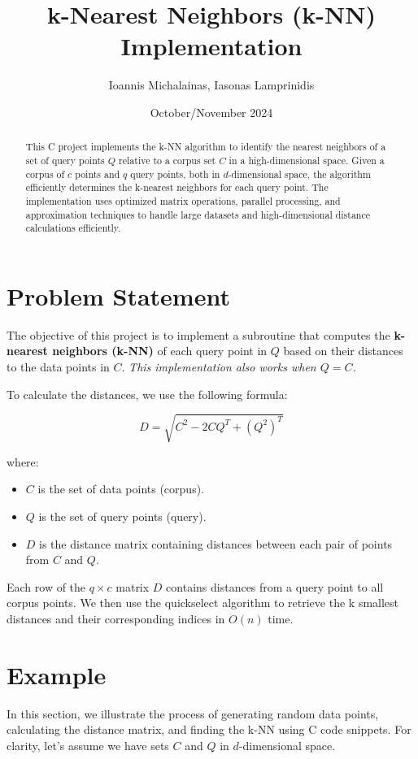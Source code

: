 \documentclass{article}
\title{\textbf{k-Nearest Neighbors (k-NN) Implementation}}
\author{Ioannis Michalainas, Iasonas Lamprinidis}
\date{October/November 2024}
\begin{document}
\maketitle

\begin{abstract}
This C project implements the k-NN algorithm to identify the nearest neighbors of a set of query points \( Q \) relative to a corpus set \( C \) in a high-dimensional space. 
Given a corpus of \( c \) points and \( q \) query points, both in \( d \)-dimensional space, the algorithm efficiently determines the k-nearest neighbors for each query point. 
The implementation uses optimized matrix operations, parallel processing, and approximation techniques to handle large datasets and high-dimensional distance calculations efficiently.
\end{abstract}

\section{Problem Statement}
The objective of this project is to implement a subroutine that computes the \textbf{k-nearest neighbors (k-NN)} of each query point in \( Q \) based on their distances to the data points in \( C \). \textit{This implementation also works when  \(Q=C\).}

To calculate the distances, we use the following formula:

\begin{equation}
    D = \sqrt{C^2 - 2 C Q^T + (Q^2)^T}
\end{equation}

where:
\begin{itemize}
    \item \( C \) is the set of data points (corpus).
    \item \( Q \) is the set of query points (query).
    \item \( D \) is the distance matrix containing distances between each pair of points from \( C \) and \( Q \).
\end{itemize}

Each row of the \( q\times c \) matrix \( D \) contains distances from a query point to all corpus points. We then use the quickselect algorithm to retrieve the k smallest distances and their corresponding indices in \( O(n) \) time. 

\section{Example}
In this section, we illustrate the process of generating random data points, calculating the distance matrix, and finding the k-NN using C code snippets. For clarity, let's assume we have sets \( C \) and \( Q \) in \( d \)-dimensional space.
\end{document}
